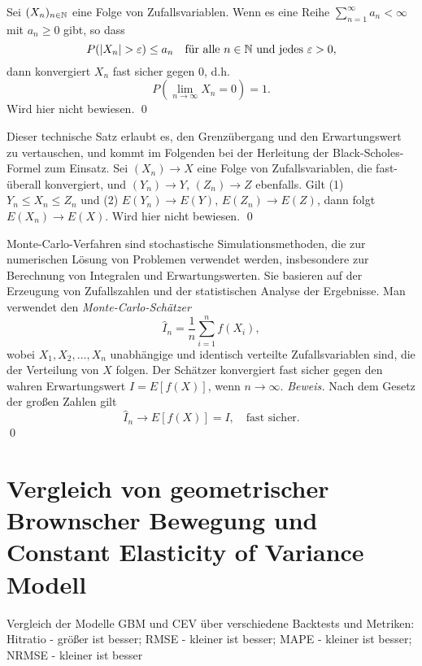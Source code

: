 \begin{lemma}
Sei $(X_n)_{n \in \Bbb N}$ eine Folge von Zufallsvariablen. Wenn es eine Reihe $\sum_{n=1}^\infty a_n \lt \infty$ mit $a_n \geq 0$ gibt, so dass
$$P(|X_n| > \varepsilon) \leq a_n \quad \text{für alle } n \in \Bbb N \text{ und jedes } \varepsilon > 0,$$
dann konvergiert $X_n$ fast sicher gegen $0$, d.h.
$$P\left(\lim_{n \to \infty} X_n = 0\right) = 1.$$
Wird hier nicht bewiesen. \qed
\end{lemma}

\begin{satz}
Dieser technische Satz erlaubt es, den Grenzübergang und den Erwartungswert zu vertauschen, und
kommt im Folgenden bei der Herleitung der Black-Scholes-Formel zum Einsatz.
Sei $(X_n) \longrightarrow X$ eine Folge von Zufallsvariablen, die fast-überall konvergiert,
und $(Y_n) \longrightarrow Y$, $(Z_n) \longrightarrow Z$ ebenfalls.
Gilt (1) $Y_n \le X_n \le Z_n$ und (2) $E(Y_n) \longrightarrow E(Y)$, $E(Z_n) \longrightarrow E(Z)$,
dann folgt $E(X_n) \longrightarrow E(X)$. Wird hier nicht bewiesen. \qed
\end{satz}

\begin{defprop}
Monte-Carlo-Verfahren sind stochastische Simulationsmethoden, die zur numerischen
Lösung von Problemen verwendet werden, insbesondere zur Berechnung von Integralen
und Erwartungswerten. Sie basieren auf der Erzeugung von Zufallszahlen und
der statistischen Analyse der Ergebnisse. Man verwendet den \textit{Monte-Carlo-Schätzer}
$$
\hat{I}_n = \frac{1}{n} \sum_{i=1}^n f(X_i),
$$
wobei $X_1, X_2, \ldots, X_n$ unabhängige und identisch verteilte Zufallsvariablen
sind, die der Verteilung von $X$ folgen. Der Schätzer konvergiert fast sicher
gegen den wahren Erwartungswert $I = E[f(X)]$, wenn $n \to \infty$.
\textit{Beweis.} Nach dem Gesetz der großen Zahlen gilt
$$\hat{I}_n \longrightarrow E[f(X)] = I, \quad \text{fast sicher.}$$ \qed
\end{defprop}

\section{Vergleich von geometrischer Brownscher Bewegung und Constant Elasticity of Variance Modell}

\begin{table}
    \centering
    \begin{sideways}
    \end{sideways}
    \caption{Vergleich der Modelle GBM und CEV über verschiedene Backtests und Metriken: Hitratio - größer ist besser; RMSE - kleiner ist besser; MAPE - kleiner ist besser; NRMSE - kleiner ist besser} 
    \label{fig:table_gbm_cev}
\end{table}
